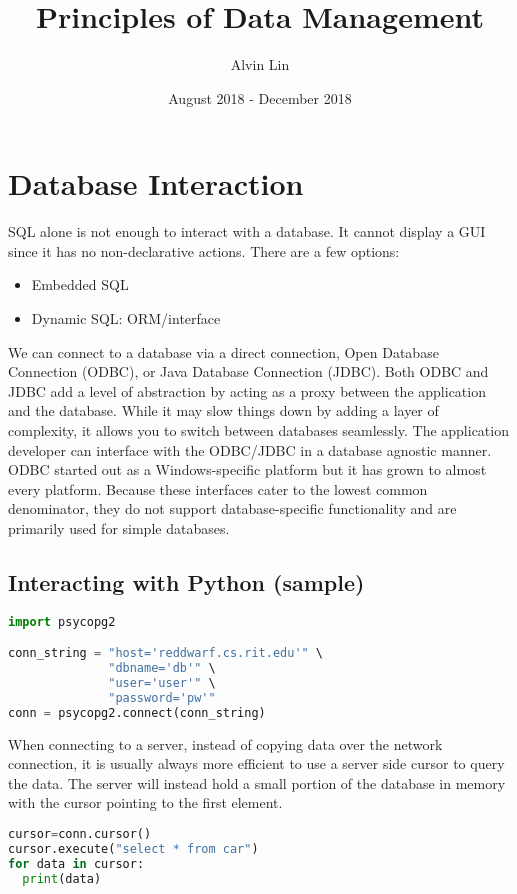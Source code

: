 \documentclass{math}
\title{Principles of Data Management}
\author{Alvin Lin}
\date{August 2018 - December 2018}
\begin{document}
\maketitle

\section*{Database Interaction}
SQL alone is not enough to interact with a database. It cannot display a GUI
since it has no non-declarative actions. There are a few options:
\begin{itemize}
  \item Embedded SQL
  \item Dynamic SQL: ORM/interface
\end{itemize}
We can connect to a database via a direct connection, Open Database Connection
(ODBC), or Java Database Connection (JDBC). Both ODBC and JDBC add a level of
abstraction by acting as a proxy between the application and the database.
While it may slow things down by adding a layer of complexity, it allows you to
switch between databases seamlessly. The application developer can interface
with the ODBC/JDBC in a database agnostic manner. ODBC started out as a
Windows-specific platform but it has grown to almost every platform. Because
these interfaces cater to the lowest common denominator, they do not support
database-specific functionality and are primarily used for simple databases.

\subsection*{Interacting with Python (sample)}
\begin{lstlisting}[language=Python]
import psycopg2

conn_string = "host='reddwarf.cs.rit.edu'" \
              "dbname='db'" \
              "user='user'" \
              "password='pw'"
conn = psycopg2.connect(conn_string)
\end{lstlisting}
When connecting to a server, instead of copying data over the network
connection, it is usually always more efficient to use a server side cursor to
query the data. The server will instead hold a small portion of the database
in memory with the cursor pointing to the first element.
\begin{lstlisting}[language=Python]
cursor=conn.cursor()
cursor.execute("select * from car")
for data in cursor:
  print(data)
\end{lstlisting}
\end{document}
